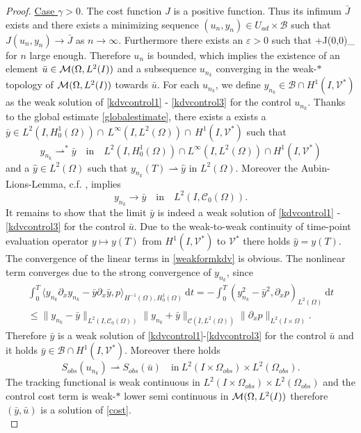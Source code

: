 \begin{proof}
\underline{Case $\gamma > 0$}. The cost function $J$ is a positive function. Thus its infimum $\bar J$ exists and there exists a minimizing sequence $(u_n,y_n) \in U_{ad} \times \mathcal B$ such that $J(u_n, y_n) \rightarrow \bar J$ as $n \rightarrow \infty$. Furthermore there exists an $\varepsilon>0$ such that
\be
\varepsilon+J(0,0)\geq \alpha {}_{\M}
\ee
for $n$ large enough. Therefore $u_n$ is bounded, which implies the existence of an element $\bar u\in\mathcal{M}(\Omega, L^{2}(I))$ and a subsequence $u_{n_k}$ converging in the weak-$*$ topology of $\mathcal{M}(\Omega, L^{2}(I))$ towards $\bar u$. For each $u_{n_k}$, we define $y_{n_k}\in \mathcal B\cap H^1(I,\mathcal V^*)$ as the weak solution of \eqref{kdvcontrol1} - \eqref{kdvcontrol3} for the control $u_{n_k}$. Thanks to the global estimate \eqref{globalestimate}, there exists a exists a $\bar y\in L^2(I,H^1_0(\Omega))\cap\,L^\infty(I,L^2(\Omega))\cap\,H^1(I,\mathcal V^\ast)$ such that
\[y_{n_k}\rightharpoonup^\ast\bar y\quad\text{in}\quad L^2(I,H^1_0(\Omega))\cap L^{\infty}(I,L^2(\Omega))\cap H^1(I,\mathcal V^\ast)\]
and a $\hat y\in L^2(\Omega)$ such that $y_{n_k}(T)\rightharpoonup \hat y$ in $L^2(\Omega)$. Moreover the Aubin-Lions-Lemma, c.f. \cite[Chapter 3, Proposition 1.3]{showalter97}, implies
\[y_{n_k}\rightarrow\bar y\quad\text{in}\quad L^2(I,\mathcal C_0(\Omega)).\]
It remains to show that the limit $\bar y$ is indeed a weak solution of \eqref{kdvcontrol1} - \eqref{kdvcontrol3} for the control $\bar u$. Due to the weak-to-weak continuity of time-point evaluation operator $y\mapsto y(T)$ from $H^1(I,\mathcal V^\ast)$ to $\mathcal V^\ast$ there holds $\hat y=y(T)$.  The convergence of the linear terms in \eqref{weakformkdv} is obvious. The nonlinear term converges due to the strong convergence of $y_{n_k}$, since
\begin{multline*}
\int_0^T\langle y_{n_k}\partial_xy_{n_k}-\bar y\partial_x\bar y,p\rangle_{H^{-1}(\Omega),H^1_0(\Omega)}~\mathrm dt=-\int_0^T(y_{n_k}^2-\bar y^2,\partial_x p)_{L^2(\Omega)}~\mathrm dt\\
\leq\|y_{n_k}-\bar y\|_{L^2(I,\mathcal C_0(\Omega))}\|y_{n_k}+\bar y\|_{\mathcal C(\bar I,L^2(\Omega))}\|\partial_x p\|_{L^2(I\times \Omega)}.
\end{multline*}
Therefore $\bar y$ is a weak solution of \eqref{kdvcontrol1}-\eqref{kdvcontrol3} for the control $\bar u$ and it holds $\bar y\in \mathcal B\cap H^1(I,\mathcal V^*)$. Moreover there holds 
\[S_{obs}(u_{n_k})\rightharpoonup S_{obs}(\bar u)\quad\text{in}~ L^2(I\times \Omega_{obs})\times L^2(\Omega_{obs}).\] The tracking functional is weak continuous in $ L^2(I\times \Omega_{obs})\times L^2(\Omega_{obs})$ and the control cost term is weak-$*$ lower semi continuous in $\mathcal{M}(\Omega, L^{2}(I))$ therefore $(\bar y,\bar u)$ is a solution of \eqref{cost}.\\

\end{proof}
